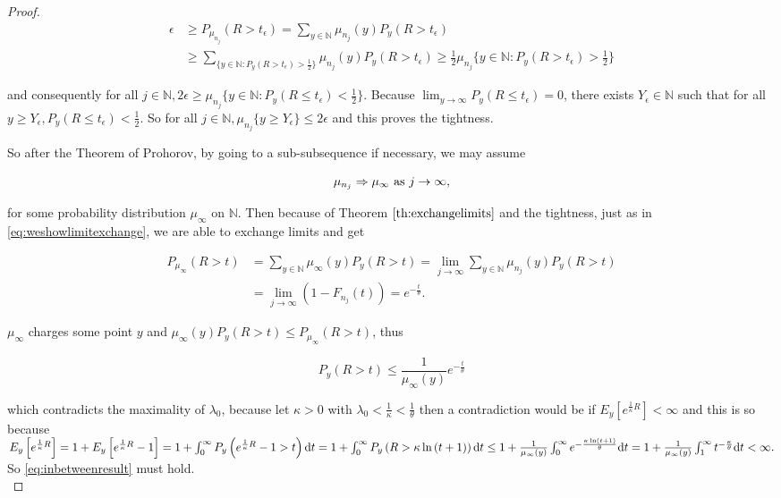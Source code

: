 \documentclass[12pt,a4paper]{scrartcl}
\numberwithin{equation}{section}
\newcommand{\N}{\mathbb{N}} %
\begin{document}
\begin{proof}
\begin{align*}
\epsilon &\geq P_{\mu_{n_j}}\left(R > t_{\epsilon}\right) = \sum_{y \in \N} \mu_{n_j}\left(y\right) P_y\left(R > t_{\epsilon}\right) \\
&\geq \sum_{\lbrace y \in \N : P_y\left(R > t_{\epsilon}\right) > \frac{1}{2}\rbrace } \mu_{n_j}\left(y\right) P_y\left(R > t_{\epsilon}\right) \geq \frac{1}{2} \mu_{n_j}\lbrace y \in \N : P_y\left(R > t_{\epsilon}\right) > \frac{1}{2}\rbrace 
\end{align*}

and consequently for all $j \in \N, 2\epsilon \geq \mu_{n_j}\lbrace y \in \N : P_y\left(R \leq t_{\epsilon}\right) < \frac{1}{2}\rbrace $. Because $\lim_{y \to \infty} P_y\left(R \leq t_{\epsilon}\right) = 0$, there exists $Y_{\epsilon} \in \N$ such that for all $ y \geq Y_{\epsilon}, P_y\left(R \leq t_{\epsilon}\right) < \frac{1}{2}$. So for all $ j \in \N, \mu_{n_j}\lbrace y \geq Y_{\epsilon} \rbrace  \leq 2 \epsilon $ and this proves the tightness.

So after the Theorem of Prohorov, by going to a sub-subsequence if necessary, we may assume 

$$ \mu_{n_j} \Rightarrow \mu_{\infty} \textnormal{ as } j \to \infty,$$

for some probability distribution $ \mu_{\infty} $ on $\N$. Then because of Theorem $\ref{th:exchangelimits}$ and the tightness, just as in \eqref{eq:weshowlimitexchange}, we are able to exchange limits and get

\begin{align*}
P_{\mu_{\infty}}\left(R > t\right) &= \sum_{y \in \N} \mu_{\infty}\left(y\right) P_y\left(R > t \right) = \lim_{j \to \infty} \sum_{y \in \N} \mu_{n_j}\left(y\right) P_y\left(R > t\right) \\
&= \lim_{j\to \infty} \left(1-F_{n_j}\left(t\right)\right) = e^{-\frac{t}{\theta}}.
\end{align*}

$\mu_{\infty}$ charges some point $y$ and $ \mu_{\infty}\left(y\right) P_y\left(R > t\right) \leq P_{\mu_{\infty}}\left(R > t\right) $, thus

$$ P_y\left(R > t\right) \leq \frac{1}{\mu_{\infty}\left(y\right)} e^{-\frac{t}{\theta}} $$

which contradicts the maximality of $\lambda_0$, because let $\kappa >0 $ with $ \lambda_0 < \frac{1}{\kappa} < \frac{1}{\theta} $ then a contradiction would be if $ E_y\left[e^{\frac{1}{\kappa} R}\right] < \infty $ and this is so because  $E_{y}\left[ e^{\frac{1}{\kappa} R} \right] = 1 + E_{y}\left[ e^{\frac{1}{\kappa} R} -1 \right] = 1 + \int_{0}^{\infty} P_{y}\left(e^{\frac{1}{\kappa} R} - 1 > t\right) \textnormal{d}t = 1+\int_{0}^{\infty} P_{y}\left( R > \kappa \ln\left(t+1\right)\right) \textnormal{d}t \leq 1+ \frac{1}{\mu_{\infty}\left(y\right)} \int_{0}^{\infty} e^{-\frac{\kappa \ln\left(t+1\right)}{\theta}} \textnormal{d}t = 1  +  \frac{1}{\mu_{\infty}\left(y\right)} \int_1^{\infty} t^{-\frac{\kappa}{\theta}} \textnormal{d} t < \infty. $ 
So \eqref{eq:inbetweenresult} must hold. \\[2ex]


\end{proof}
\end{document}
